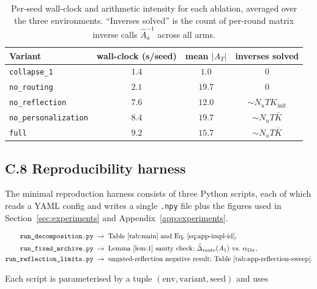 \documentclass{article} %
\begin{document}
\begin{table}[h]
\centering
\small
\begin{tabular}{lccc}
\toprule
Variant & wall-clock (s/seed) & mean $|A_T|$ & inverses solved \\
\midrule
\texttt{collapse\_1}        & $1.4$ & $1.0$  & $0$ \\
\texttt{no\_routing}        & $2.1$ & $19.7$ & $0$ \\
\texttt{no\_reflection}     & $7.6$ & $12.0$ & $\sim N_u T K_{\text{init}}$ \\
\texttt{no\_personalization}& $8.4$ & $19.7$ & $\sim N_u T \bar K$ \\
\texttt{full}               & $9.2$ & $15.7$ & $\sim N_u T \bar K$ \\
\bottomrule
\end{tabular}
\caption{Per-seed wall-clock and arithmetic intensity for each ablation, averaged over the three environments. ``Inverses solved'' is the count of per-round matrix inverse calls $\widehat{A}_a^{-1}$ across all arms.}
\label{tab:app-impl-runtime}
\end{table}

\subsection{C.8 Reproducibility harness}

\label{app:impl-repro}

The minimal reproduction harness consists of three Python scripts, each of which reads a YAML config and writes a single \texttt{.npy} file plus the figures used in Section~\ref{sec:experiments} and Appendix~\ref{app:experiments}.

\begin{align}
\label{eq:app-impl-h1}
\texttt{run\_decomposition.py} &\;\rightarrow\; \text{Table~\ref{tab:main} and Eq.~\eqref{eq:app-impl-id}},\\
\label{eq:app-impl-h2}
\texttt{run\_fixed\_archive.py} &\;\rightarrow\; \text{Lemma~\ref{lem:1} sanity check; }\widehat\Delta_{\mathrm{route}}(A_1)\text{ vs.\ }\alpha_{\mathrm{Dir}},\\
\label{eq:app-impl-h3}
\texttt{run\_reflection\_limits.py} &\;\rightarrow\; \text{ungated-reflection negative result; Table~\ref{tab:app-reflection-sweep}}.
\end{align}

Each script is parameterised by a tuple $(\text{env}, \text{variant}, \text{seed})$ and uses
\end{document}
